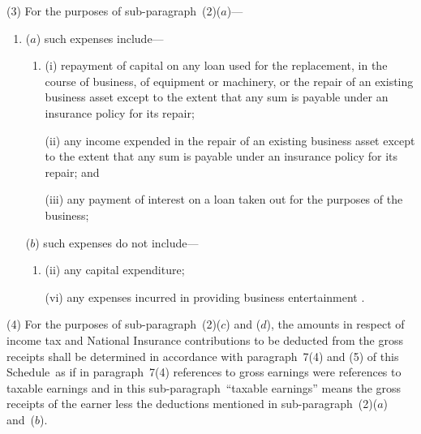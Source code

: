 \documentclass[12pt,a4paper]{article}
\begin{document}
(3) For the purposes of sub-paragraph~(2)($a$)—
\begin{enumerate}\item[]
($a$) such expenses include—
\begin{enumerate}\item[]
(i) repayment of capital on any loan used for the replacement, in the course of business, of equipment or machinery, or the repair of an existing business asset except to the extent that any sum is payable under an insurance policy for its repair;

(ii) any income expended in the repair of an existing business asset except to the extent that any sum is payable under an insurance policy for its repair; and

(iii) any payment of interest on a loan taken out for the purposes of the business;
\end{enumerate}

($b$) such expenses do not include—
\begin{enumerate}\item[]

(ii) any capital expenditure;




(vi) any expenses incurred in providing business entertainment%
%
.
\end{enumerate}
\end{enumerate}

(4) For the purposes of sub-paragraph~(2)($c$)  and ($d$), the amounts in respect of income tax and National Insurance contributions to be deducted from the gross receipts shall be determined in accordance with paragraph~7(4) and (5) of this Schedule~as if in paragraph~7(4) references to gross earnings were references to taxable earnings and in this sub-paragraph~“taxable earnings” means the gross receipts of the earner less the deductions mentioned in sub-paragraph~(2)($a$)  and~($b$).
\end{document}
